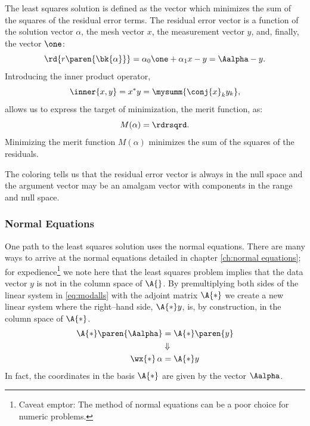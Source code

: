 The least squares solution is defined as the vector which minimizes the sum of the squares of the residual error terms. The residual error vector is a function of the solution vector $\alpha$, the mesh vector $x$, the measurement vector $y$, and, finally, the vector $\one$:
%
%
\begin{equation}
	\rd{r\paren{\bk{\alpha}}} =  \alpha_{0}\one + \alpha_{1} x - y = \Aalpha - y.
\label{eq:ch-01 residual}
\end{equation}
%
Introducing the inner product operator,
\begin{equation}
	\inner{x,y} = x^{*}y = \mysumm{\conj{x}_{k}y_{k}},
\end{equation}
%
allows us to express the target of minimization, the merit function, as:
%
%
\begin{equation}
	M(\alpha)= \rdrsqrd.
\label{eq:ch-01 merit}
\end{equation}
%
Minimizing the merit function $M(\alpha)$ minimizes the sum of the squares of the residuals. 

The coloring tells us that the residual error vector is always in the null space and the argument vector may be an amalgam vector with components in the range and null space.

\subsubsection{Normal Equations} 
One path to the least squares solution uses the normal equations. There are many ways to arrive at the normal equations detailed in chapter \ref{ch:normal equations}; for expedience\footnote{Caveat emptor: The method of normal equations can be a poor choice for numeric problems.} we note here that the least squares problem implies that the data vector $y$ is not in the column space of $\A{}$. By premultiplying both sides of the linear system in \eqref{eq:modalls} with the adjoint matrix $\A{*}$ we create a new linear system where the right--hand side, $\A{*}y$, is, by construction, in the column space of $\A{*}$.
%
\begin{equation*}
	\begin{split}
		\A{*}\paren{ \Aalpha } &=  \A{*}\paren{y} \\
		&\Downarrow \\
		\wx{*}\,\alpha &= \A{*}y
	\end{split}
\end{equation*}
%
In fact, the coordinates in the basis $\A{*}$ are given by the vector $\Aalpha$.

